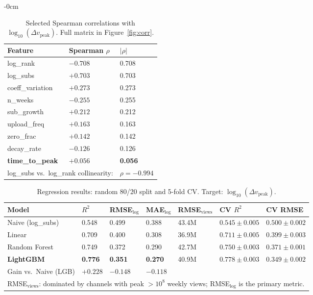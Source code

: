\documentclass[journal,article,submit,pdftex,moreauthors]{Definitions/mdpi}
\begin{document}
\begin{adjustwidth}{-\extralength}{0cm}
\begin{table}[H]
\caption{Selected Spearman correlations with $\log_{10}(\Delta v_\text{peak})$.
Full matrix in Figure~\ref{fig:corr}.\label{tab:corr_selected}}
\begin{tabularx}{\textwidth}{lll}
\toprule
\textbf{Feature}&\textbf{Spearman $\rho$}&\textbf{$|\rho|$}\\
\midrule
log\_rank         & $-0.708$ & 0.708 \\
log\_subs         & $+0.703$ & 0.703 \\
coeff\_variation  & $+0.273$ & 0.273 \\
n\_weeks          & $-0.255$ & 0.255 \\
sub\_growth       & $+0.212$ & 0.212 \\
upload\_freq      & $+0.163$ & 0.163 \\
zero\_frac        & $+0.142$ & 0.142 \\
decay\_rate       & $-0.126$ & 0.126 \\
\textbf{time\_to\_peak} & $\mathbf{+0.056}$ & \textbf{0.056} \\
\midrule
\multicolumn{2}{l}{log\_subs vs.\ log\_rank collinearity:} & $\rho = -0.994$ \\
\bottomrule
\end{tabularx}
\end{table}

\begin{table}[H]
\caption{Regression results: random 80/20 split and 5-fold CV.
Target: $\log_{10}(\Delta v_\text{peak})$.\label{tab:regression}}
\begin{tabularx}{\textwidth}{lllllll}
\toprule
\textbf{Model}&\textbf{$R^2$}&\textbf{RMSE$_\text{log}$}&
\textbf{MAE$_\text{log}$}&\textbf{RMSE$_\text{views}$}&
\textbf{CV $R^2$}&\textbf{CV RMSE}\\
\midrule
Naive (log\_subs)  & 0.548 & 0.499 & 0.388 & 43.4M &
  $0.545 \pm 0.005$ & $0.500 \pm 0.002$ \\
Linear             & 0.709 & 0.400 & 0.308 & 36.9M &
  $0.711 \pm 0.005$ & $0.399 \pm 0.003$ \\
Random Forest      & 0.749 & 0.372 & 0.290 & 42.7M &
  $0.750 \pm 0.003$ & $0.371 \pm 0.001$ \\
\textbf{LightGBM}  &\textbf{0.776}&\textbf{0.351}&\textbf{0.270}& 40.9M &
  $\mathbf{0.778 \pm 0.003}$ & $\mathbf{0.349 \pm 0.002}$ \\
\midrule
Gain vs.\ Naive (LGB) & $+0.228$ & $-0.148$ & $-0.118$ & & & \\
\bottomrule
\multicolumn{7}{l}{\footnotesize RMSE$_\text{views}$: dominated by channels
with peak $> 10^8$ weekly views; RMSE$_\text{log}$ is the primary metric.}
\end{tabularx}
\end{table}


\end{adjustwidth}
\end{document}
